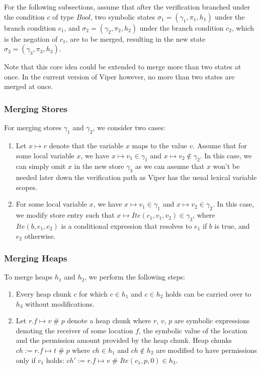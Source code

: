 \documentclass[11pt]{article}
\DeclareMathOperator{\perm}{\mathbin{\#}}
\begin{document}
    For the following subsections, assume that after the verification branched under the condition $c$ of type $Bool$,
    two symbolic states $\sigma_1 = (\gamma_1, \pi_1, h_1)$ under the branch condition $c_1$, and
    $\sigma_2 = (\gamma_2, \pi_2, h_2)$ under the branch condition $c_2$, which is the negation
    of $c_1$, are to be merged,
    resulting in the new state $\sigma_3 = (\gamma_3, \pi_3, h_3)$.

    Note that this core idea could be extended to merge more than two states at once. In 
    the current version of Viper however,
    no more than two states are merged at once.

    \subsubsection{Merging Stores}

    For merging stores $\gamma_1$ and $\gamma_2$, we consider two cases:

    \begin{enumerate}
        \item Let $x \mapsto v$ denote that the variable $x$ maps to the value $v$.
            Assume that for some local variable $x$, we have $x \mapsto v_1 \in \gamma_1$ and $x \mapsto v_2 \notin \gamma_2$.
            In this case, we can simply omit $x$ in the new store $\gamma_3$ as we can assume that $x$ won't
            be needed later down the verification path as Viper has the usual lexical
            variable scopes.
        \item For some local variable $x$, we have $x \mapsto v_1 \in \gamma_1$ and $x \mapsto v_2 \in \gamma_2$.
            In this case, we modify store entry such that $x \mapsto Ite(c_1, v_1, v_2) \in \gamma_3$,
            where $Ite(b, e_1, e_2)$ is a conditional expression that resolves to $e_1$ if $b$ is true, and $e_2$ otherwise.
    \end{enumerate}

    \subsubsection{Merging Heaps} \label{merging-the-heap}

    To merge heaps $h_1$ and $h_2$, we perform the following steps:

    \begin{enumerate}
        \item Every heap chunk $c$ for which $c \in h_1$ and $c \in h_2$ holds can be carried over to $h_3$
            without modifications.
        \item Let $r.f \mapsto v \perm p$ denote a heap chunk where $r$, $v$, $p$ are symbolic expressions
            denoting the receiver of some location $f$, the symbolic value of the location and the permission
            amount provided by the heap chunk.
            Heap chunks $ch := r.f \mapsto t \perm p$ where $ch \in h_1$ and $ch \notin h_2$ are modified to
            have permissions only if $c_1$ holds: $ch' := r.f \mapsto v \perm Ite(c_1, p, 0) \in h_3$.
    \end{enumerate}
\end{document}
